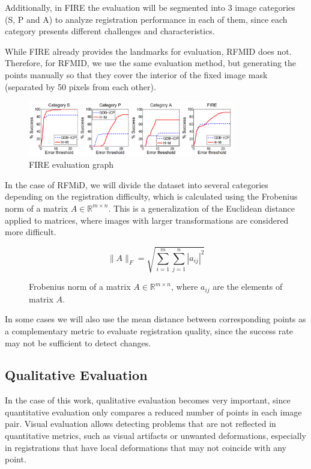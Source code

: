 Additionally, in FIRE the evaluation will be segmented into 3 image categories (S, P and A) to analyze registration performance in each of them, since each category presents different challenges and characteristics.

While FIRE already provides the landmarks for evaluation, RFMID does not.
Therefore, for RFMID, we use the same evaluation method, but generating the points manually so that they cover the interior of the fixed image mask (separated by 50 pixels from each other).

\begin{figure}[tbp]
    \centering
    \includegraphics[width=0.8\textwidth]{imaxes/fire_aval.png}
    \caption{FIRE evaluation graph \cite{FIRE}}
    \label{fig:fire_aval}
\end{figure}

In the case of RFMiD, we will divide the dataset into several categories depending on the registration difficulty, which is calculated using the Frobenius norm of a matrix $A \in \mathbb{R}^{m \times n}$.
This is a generalization of the Euclidean distance applied to matrices, where images with larger transformations are considered more difficult.

\begin{figure}[tbp]
    \centering
    \[
    \|A\|_F = \sqrt{\sum_{i=1}^{m} \sum_{j=1}^{n} |a_{ij}|^2}
    \]
    \caption{Frobenius norm of a matrix $A \in \mathbb{R}^{m \times n}$, where $a_{ij}$ are the elements of matrix $A$.}
    \label{fig:frobenius_norm}
\end{figure}

In some cases we will also use the mean distance between corresponding points as a complementary metric to evaluate registration quality, since the success rate may not be sufficient to detect changes.

\subsection{Qualitative Evaluation}
\label{subsec:Avaliación Cualitativa}

In the case of this work, qualitative evaluation becomes very important, since quantitative evaluation only compares a reduced number of points in each image pair.
Visual evaluation allows detecting problems that are not reflected in quantitative metrics, such as visual artifacts or unwanted deformations,
especially in registrations that have local deformations that may not coincide with any point.

